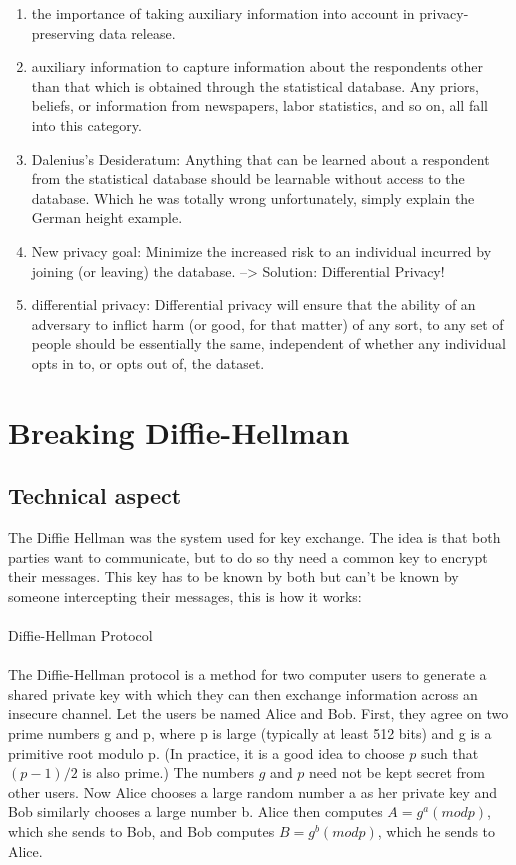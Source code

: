 \documentclass[10pt,a4paper]{report}
\begin{document}
\begin{enumerate}
\item the importance of taking auxiliary information into account in privacy-preserving data release. 
\item auxiliary information to capture information about the respondents other than that which is obtained through the statistical database. Any priors, beliefs, or information from newspapers, labor statistics, and so on, all fall into this category.
\item Dalenius’s Desideratum: Anything that can be learned about a respondent from the statistical database should be learnable without access to the database. Which he was totally wrong unfortunately, simply explain the German height example.
\item New privacy goal: Minimize the increased risk to an individual incurred by joining (or leaving) the database. --> Solution: Differential Privacy!
\item differential privacy: Differential privacy will ensure that the ability of an adversary to inflict harm (or good, for that matter) of any sort, to any set of people should be essentially the same, independent of whether any individual opts in to, or opts out of, the dataset.
\end{enumerate}
\chapter{Breaking Diffie-Hellman}
\section{Technical aspect}
The Diffie Hellman was the system used for key exchange. The idea is that both parties want to communicate, but to do so thy need a common key to encrypt their messages. This key has to be known by both but can't be known by someone intercepting their messages, this is how it works: \\\\
Diffie-Hellman Protocol\\\\

The Diffie-Hellman protocol is a method for two computer users to generate a shared private key with which they can then exchange information across an insecure channel. Let the users be named Alice and Bob. First, they agree on two prime numbers g and p, where p is large (typically at least 512 bits) and g is a primitive root modulo p. (In practice, it is a good idea to choose $p$ such that $(p-1)/2$ is also prime.) The numbers $g$ and $p$ need not be kept secret from other users. Now Alice chooses a large random number a as her private key and Bob similarly chooses a large number b. Alice then computes $A=g^a (mod p)$, which she sends to Bob, and Bob computes $B=g^b (mod p)$, which he sends to Alice.\\\\
\end{document}
